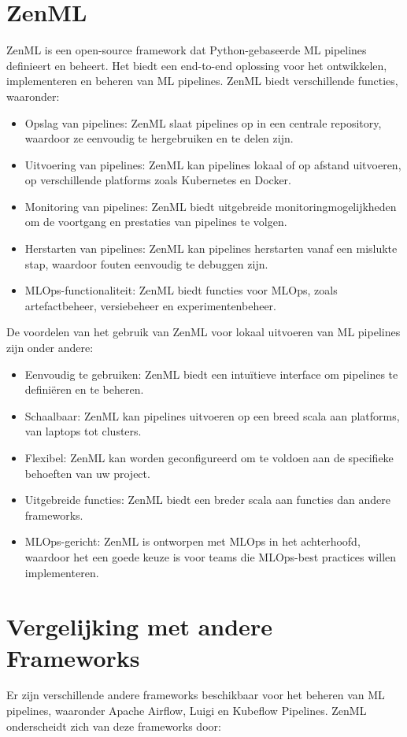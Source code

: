 \section{ZenML}
ZenML is een open-source framework dat Python-gebaseerde ML pipelines definieert en beheert. Het biedt een end-to-end oplossing voor het ontwikkelen, implementeren en beheren van ML pipelines. ZenML biedt verschillende functies, waaronder:

\begin{itemize}
    \item Opslag van pipelines: ZenML slaat pipelines op in een centrale repository, waardoor ze eenvoudig te hergebruiken en te delen zijn.
    \item Uitvoering van pipelines: ZenML kan pipelines lokaal of op afstand uitvoeren, op verschillende platforms zoals Kubernetes en Docker.
    \item Monitoring van pipelines: ZenML biedt uitgebreide monitoringmogelijkheden om de voortgang en prestaties van pipelines te volgen.
    \item Herstarten van pipelines: ZenML kan pipelines herstarten vanaf een mislukte stap, waardoor fouten eenvoudig te debuggen zijn.
    \item MLOps-functionaliteit: ZenML biedt functies voor MLOps, zoals artefactbeheer, versiebeheer en experimentenbeheer.
\end{itemize}

De voordelen van het gebruik van ZenML voor lokaal uitvoeren van ML pipelines zijn onder andere:

\begin{itemize}
    \item Eenvoudig te gebruiken: ZenML biedt een intuïtieve interface om pipelines te definiëren en te beheren.
    \item Schaalbaar: ZenML kan pipelines uitvoeren op een breed scala aan platforms, van laptops tot clusters.
    \item Flexibel: ZenML kan worden geconfigureerd om te voldoen aan de specifieke behoeften van uw project.
    \item Uitgebreide functies: ZenML biedt een breder scala aan functies dan andere frameworks.
    \item MLOps-gericht: ZenML is ontworpen met MLOps in het achterhoofd, waardoor het een goede keuze is voor teams die MLOps-best practices willen implementeren.
\end{itemize}

\section{Vergelijking met andere Frameworks}
Er zijn verschillende andere frameworks beschikbaar voor het beheren van ML pipelines, waaronder Apache Airflow, Luigi en Kubeflow Pipelines. ZenML onderscheidt zich van deze frameworks door:

